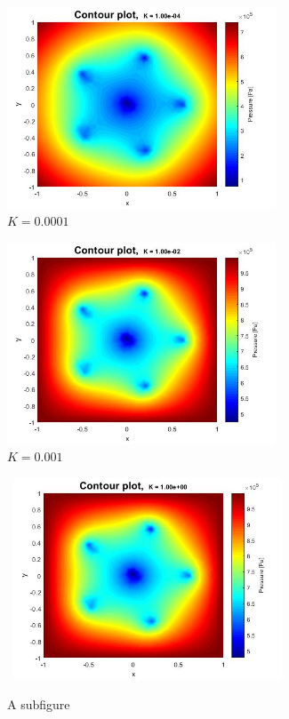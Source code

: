 \documentclass[a4paper]{report}
\begin{document}
\begin{figure}
	\centering
	\begin{subfigure}{.45\textwidth}
		\centering
		\includegraphics[width=8cm]{2Dheatk00001.jpg}
		\caption{$K=0.0001$}
		\label{fig:sub1}
	\end{subfigure}%
	\begin{subfigure}{.45\textwidth}
		\centering
		\includegraphics[width=8cm]{2Dheatk001.jpg}
		\caption{$K=0.001$}
		\label{fig:sub2}
	\end{subfigure}
	\begin{subfigure}{.45\textwidth}
	\centering\
	\includegraphics[width=8cm]{2Dheatk1.jpg}
	\caption{A subfigure}
	\label{fig:sub3}
	\end{subfigure}%
	\begin{subfigure}{.45\textwidth}

\end{subfigure}
\end{figure}
\end{document}
